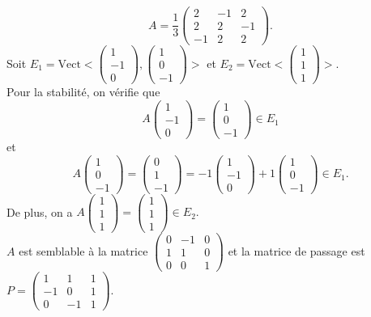 \documentclass[a4paper]{book}
\begin{document}
\begin{Exemple}
$$A=\frac{1}{3}\begin{pmatrix}2 & -1 & 2 \\ 2 &2&-1\\ -1&2&2\end{pmatrix}.$$ Soit $E_1=\mathrm{Vect}<\begin{pmatrix}1\\-1 \\0 \end{pmatrix},\begin{pmatrix}1\\0 \\-1 \end{pmatrix}>$ et $E_2=\mathrm{Vect}<\begin{pmatrix}1\\1 \\1 \end{pmatrix}>$.\\
Pour la stabilité, on vérifie que $$A\begin{pmatrix}1\\-1 \\0 \end{pmatrix}=\begin{pmatrix}1\\0 \\-1 \end{pmatrix}\in E_1$$ et $$A\begin{pmatrix}1\\0 \\-1 \end{pmatrix}=\begin{pmatrix}0\\1 \\-1 \end{pmatrix}=-1\begin{pmatrix}1\\-1 \\0 \end{pmatrix} + 1\begin{pmatrix}1\\0 \\-1 \end{pmatrix}\in E_1.$$
De plus, on a $A\begin{pmatrix}1\\1 \\1 \end{pmatrix}=\begin{pmatrix}1\\1 \\1 \end{pmatrix}\in E_2.$\\
$A$ est semblable à la matrice $\begin{pmatrix}0 & -1 & 0 \\ 1 &1&0\\0&0&1\end{pmatrix}$ et la matrice de passage est $P=\begin{pmatrix}1 &1 & 1 \\ -1 &0&1\\0&-1&1\end{pmatrix}$.
\end{Exemple}
\end{document}
